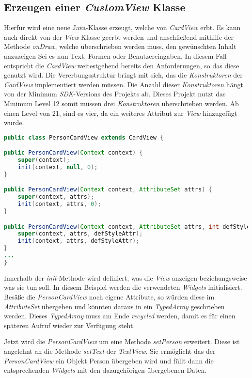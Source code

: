 \subsection{Erzeugen einer \textit{CustomView} Klasse}

Hierfür wird eine neue Java-Klasse erzeugt, welche von \textit{CardView} erbt. Es kann auch direkt von der \textit{View}-Klasse geerbt werden und anschließend mithilfe der Methode \textit{onDraw}, welche überschrieben werden muss, den gewünschten Inhalt anzuzeigen Sei es nun Text, Formen oder Benutzereingaben.
In diesem Fall entspricht die \textit{CardView} weitestgehend bereits den Anforderungen, so das diese genutzt wird.
Die Vererbungsstruktur bringt mit sich, das die \textit{Konstruktoren} der \textit{CardView} implementiert werden müssen.
Die Anzahl dieser \textit{Konstruktoren} hängt von der Minimum \textit{SDK}-Versions des Projekts ab. Dieses Projekt nutzt das Minimum Level 12 somit müssen drei \textit{Konstruktoren} überschrieben werden. Ab einen Level von 21, sind es vier, da ein weiteres Attribut zur \textit{View} hinzugefügt wurde.

\begin{lstlisting}[label=lst:personCardView,
language=java,
firstnumber=1,
caption=\textit{Konstruktoren} der \textit{PersonCardView}]				  
public class PersonCardView extends CardView {

public PersonCardView(Context context) {
	super(context);
	init(context, null, 0);
}

public PersonCardView(Context context, AttributeSet attrs) {
	super(context, attrs);
	init(context, attrs, 0);
}

public PersonCardView(Context context, AttributeSet attrs, int defStyleAttr) {
	super(context, attrs, defStyleAttr);
	init(context, attrs, defStyleAttr);
}
...
}
\end{lstlisting}

Innerhalb der \textit{init}-Methode wird definiert, was die \textit{View} anzeigen beziehungsweise was sie tun soll. 
In diesem Beispiel werden die verwendeten \textit{Widgets} initialisiert. Besäße die \textit{PersonCardView} noch eigene Attribute, so würden diese im \textit{AttributeSet} übergeben und könnten daraus in ein \textit{TypedArray} geschrieben werden. Dieses \textit{TypedArray} muss am Ende \textit{recycled} werden, damit es für einen späteren Aufruf wieder zur Verfügung steht.

\newpage
Jetzt wird die \textit{PersonCardView} um eine Methode \textit{setPerson} erweitert. Diese ist angelehnt an die Methode \textit{setText} der \textit{TextView}. Sie ermöglicht das der \textit{PersonCardView} ein Objekt Person übergeben wird und füllt dann die entsprechenden \textit{Widgets} mit den dazugehörigen übergebenen Daten.

